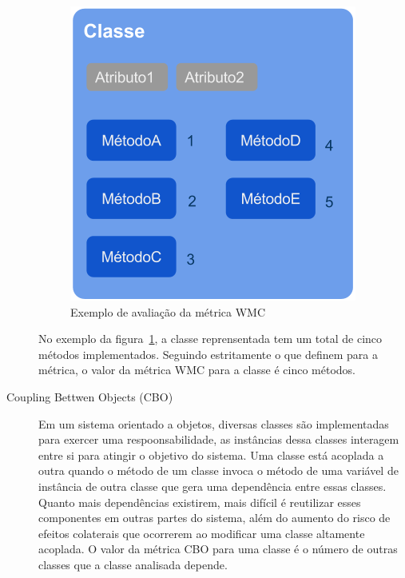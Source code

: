 \documentclass[conference]{IEEEtran}
\begin{document}
\begin{description}
\begin{figure}[htb]
	\begin{center}
		\includegraphics[scale=0.6]{img/pic_wmc.png}
	\end{center}
	\caption{\label{fig:pic_wmc}Exemplo de avaliação da métrica WMC}
	
\end{figure}

No exemplo da figura~\ref{fig:pic_wmc}, a classe reprensentada tem um total de
cinco métodos implementados. Seguindo estritamente o que 
definem para a métrica, o valor da métrica WMC para a classe é cinco métodos.


\item[Coupling Bettwen Objects (CBO)]  Em um sistema orientado a objetos,
diversas classes são implementadas para exercer uma respoonsabilidade, as
instâncias dessa classes interagem entre si para atingir o objetivo do sistema.
Uma classe está acoplada a outra quando o método de um classe invoca o método de
uma variável de instância de outra classe que gera uma dependência entre essas
classes. Quanto mais dependências existirem, mais difícil é reutilizar esses
componentes em outras partes do sistema, além do aumento do risco de efeitos
colaterais que ocorrerem ao modificar uma classe altamente acoplada. O valor da
métrica CBO para uma classe é o número de outras classes que a classe analisada
depende.



\end{description}
\end{document}
